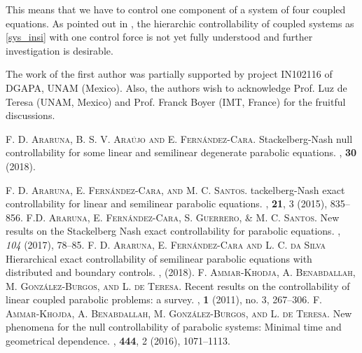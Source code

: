 \documentclass[preprint,10pt]{article}
\numberwithin{equation}{section}
\numberwithin{theorem}{section}
\begin{document}
{\begin{enumerate}
This means that we have to control one component of a system of four coupled equations. As pointed out in \cite{vhs_honor}, the hierarchic controllability of coupled systems as \eqref{sys_insi} with one control force is not yet fully understood and further investigation is desirable. 

\renewcommand{\abstractname}{Acknowledgements}
\begin{abstract}
\end{abstract}
\vspace{-0.5cm}
The work of the first author was partially supported by project   IN102116 of DGAPA,
UNAM (Mexico). Also, the authors wish to acknowledge  Prof. Luz de Teresa (UNAM, Mexico) and Prof. Franck Boyer (IMT, France) for the fruitful discussions. 
\end{enumerate}  

\begin{thebibliography}{7}

\textsc{F. D. Araruna, B. S. V. Ara\'ujo and E. Fern\'andez-Cara.}
\newblock Stackelberg-Nash null controllability for some linear and semilinear degenerate parabolic equations. 
, \textbf{30} (2018).

\textsc{F. D. Araruna, E. Fern\'andez-Cara, and M. C. Santos.}
tackelberg-{N}ash exact controllability for linear and semilinear parabolic equations.
, \textbf{21}, 3 (2015), 835--856.
%
\textsc{F.D. Araruna, E. Fern\'andez-Cara, S. Guerrero, \& M. C.  Santos.} 
\newblock New results on the Stackelberg Nash exact controllability for parabolic equations. 
, \textit{104} (2017), 78--85. 
%
\textsc{F. D. Araruna, E. Fern\'andez-Cara and L. C. da  Silva}
\newblock Hierarchical exact controllability of semilinear parabolic equations with distributed and boundary controls.
, (2018). 
%
%
\textsc{F. Ammar-Khodja, A. Benabdallah, M. Gonz\'alez-Burgos, and L. de Teresa.}
\newblock Recent results on the controllability of linear coupled parabolic problems: a survey. 
, \textbf{1} (2011), no. 3, 267--306.
%
\textsc{F. Ammar-Khojda, A. Benabdallah, M. Gonz\'alez-Burgos, and L. de Teresa.}
\newblock New phenomena for the null controllability of parabolic systems: Minimal time and geometrical dependence.
, \textbf{444}, 2 (2016), 1071--1113.


\end{thebibliography}}
\end{document}
